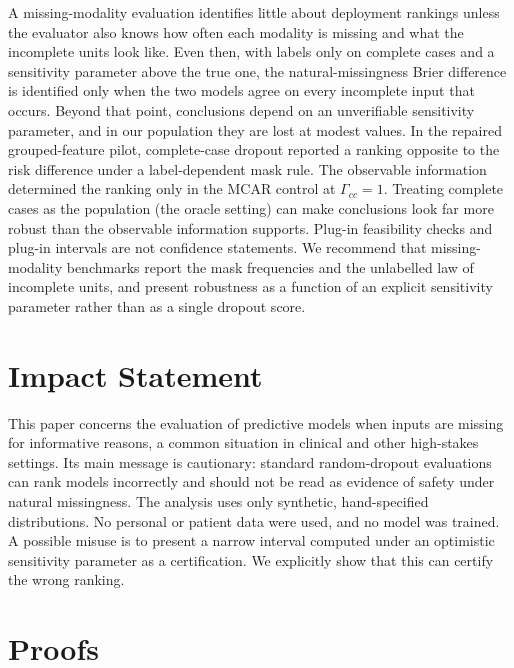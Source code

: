 \documentclass{article}
\theoremstyle{plain}
\theoremstyle{definition}
\theoremstyle{remark}
\begin{document}
A missing-modality evaluation identifies little about deployment rankings
unless the evaluator also knows how often each modality is missing and what
the incomplete units look like. Even then, with labels only on complete
cases and a sensitivity parameter above the true one, the natural-missingness
Brier difference is identified only when the two models agree on every
incomplete input that occurs. Beyond that point, conclusions
depend on an unverifiable sensitivity parameter, and in our population they
are lost at modest values. In the repaired grouped-feature pilot,
complete-case dropout reported a ranking opposite to the risk difference under
a label-dependent mask rule. The observable information determined the
ranking only in the MCAR control at $\Gamma_{cc}=1$. Treating complete cases as the population (the
oracle setting) can make conclusions look far more robust than the observable
information supports. Plug-in feasibility checks and plug-in intervals are
not confidence statements. We recommend that missing-modality benchmarks
report the mask frequencies and the unlabelled law of incomplete units, and
present robustness as a function of an explicit sensitivity parameter
rather than as a single dropout score.\label{end:main}

\section*{Impact Statement}
This paper concerns the evaluation of predictive models when inputs are
missing for informative reasons, a common situation in clinical and other
high-stakes settings. Its main message is cautionary: standard
random-dropout evaluations can rank models incorrectly and should not be read
as evidence of safety under natural missingness. The analysis uses only
synthetic, hand-specified distributions. No personal or patient data were
used, and no model was trained. A possible misuse is to present a narrow
interval computed under an optimistic sensitivity parameter as a
certification. We explicitly show that this can certify the wrong ranking.




\newpage
\appendix
\onecolumn

\section{Proofs}
\label{app:proofs}
\end{document}
